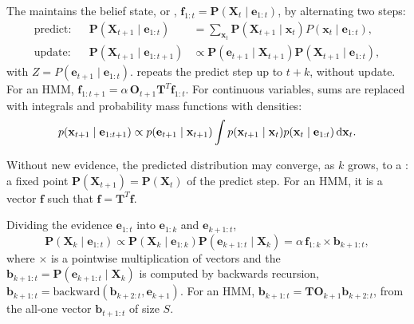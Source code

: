\documentclass[11pt, a4paper]{exam}
\begin{document}
\begin{recap}
    The  maintains the belief state, or , $\mathbf{f}_{1:t} = \mathbf{P}(\mathbf{X}_t \mid \mathbf{e}_{1:t})$, by alternating two steps:
    \begin{align*}
        \text{predict:} && \mathbf{P}(\mathbf{X}_{t+1} \mid \mathbf{e}_{1:t}) & = \sum_{\mathbf{x}_t} \mathbf{P}(\mathbf{X}_{t+1} \mid \mathbf{x}_t) P(\mathbf{x}_t \mid \mathbf{e}_{1:t}), \\
        \text{update:} && \mathbf{P}(\mathbf{X}_{t+1} \mid \mathbf{e}_{1:t+1}) & \propto \mathbf{P}(\mathbf{e}_{t+1} \mid \mathbf{X}_{t+1}) \mathbf{P}(\mathbf{X}_{t+1} \mid \mathbf{e}_{1:t}),
    \end{align*}
    with $Z = P(\mathbf{e}_{t+1} \mid \mathbf{e}_{1:t})$.  repeats the predict step up to $t + k$, without update. For an HMM, $\mathbf{f}_{1:t+1} = \alpha \, \mathbf{O}_{t+1} \mathbf{T}^T \mathbf{f}_{1:t}$. For continuous variables, sums are replaced with integrals and probability mass functions with densities:
    \[
        p(\mathbf{x}_{t+1} \mid \mathbf{e}_{1:t+1}) \propto p(\mathbf{e}_{t+1} \mid \mathbf{x}_{t+1}) \int p(\mathbf{x}_{t+1} \mid \mathbf{x}_t) p(\mathbf{x}_t \mid \mathbf{e}_{1:t}) \operatorname{d}\!{\mathbf{x}_t}.
    \]

    Without new evidence, the predicted distribution may converge, as $k$ grows, to a : a fixed point $\mathbf{P}(\mathbf{X}_{t+1}) = \mathbf{P}(\mathbf{X}_t)$ of the predict step. For an HMM, it is a vector $\mathbf{f}$ such that $\mathbf{f} = \mathbf{T}^T \mathbf{f}$.

    Dividing the evidence $\mathbf{e}_{1:t}$ into $\mathbf{e}_{1:k}$ and $\mathbf{e}_{k+1:t}$,
    \[
        \mathbf{P}(\mathbf{X}_k \mid \mathbf{e}_{1:t}) \propto \mathbf{P}(\mathbf{X}_k \mid \mathbf{e}_{1:k}) \mathbf{P}(\mathbf{e}_{k+1:t} \mid \mathbf{X}_k) = \alpha \, \mathbf{f}_{1:k} \times \mathbf{b}_{k+1:t},
    \]
    where $\times$ is a pointwise multiplication of vectors and the  $\mathbf{b}_{k+1:t} = \mathbf{P}(\mathbf{e}_{k+1:t} \mid \mathbf{X}_k)$ is computed by backwards recursion, $\mathbf{b}_{k+1:t} = \text{backward}(\mathbf{b}_{k+2:t}, \mathbf{e}_{k+1})$. For an HMM, $\mathbf{b}_{k+1:t} = \mathbf{T} \mathbf{O}_{k+1} \mathbf{b}_{k+2:t}$, from the all-one vector $\mathbf{b}_{t+1:t}$ of size $S$.


\end{recap}
\end{document}

